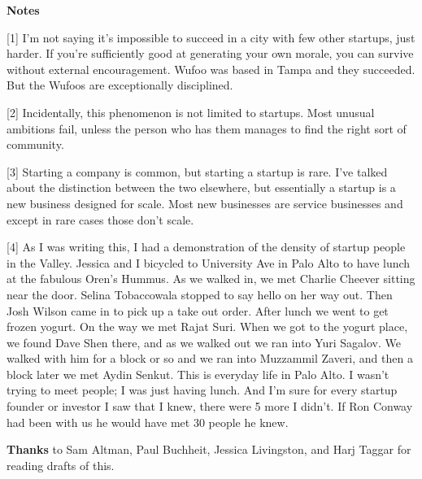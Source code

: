 \textbf{Notes}

[1] I'm not saying it's impossible to succeed in a city with
                    few other startups, just harder. If you're sufficiently good
                    at generating your own morale, you can survive without
                    external encouragement. Wufoo was based in Tampa and they
                    succeeded. But the Wufoos are exceptionally disciplined.

[2] Incidentally, this phenomenon is not limited to startups.
                    Most unusual ambitions fail, unless the person who has them
                    manages to find the right sort of community.

[3] Starting a company is common, but starting a startup is
                    rare. I've talked about the distinction between the two
                    elsewhere, but essentially a startup is a new business
                    designed for scale. Most new businesses are service
                    businesses and except in rare cases those don't scale.

[4] As I was writing this, I had a demonstration of the
                    density of startup people in the Valley. Jessica and I
                    bicycled to University Ave in Palo Alto to have lunch at the
                    fabulous Oren's Hummus. As we walked in, we met Charlie
                    Cheever sitting near the door. Selina Tobaccowala stopped to
                    say hello on her way out. Then Josh Wilson came in to pick
                    up a take out order. After lunch we went to get frozen
                    yogurt. On the way we met Rajat Suri. When we got to the
                    yogurt place, we found Dave Shen there, and as we walked out
                    we ran into Yuri Sagalov. We walked with him for a block or
                    so and we ran into Muzzammil Zaveri, and then a block later
                    we met Aydin Senkut. This is everyday life in Palo Alto. I
                    wasn't trying to meet people; I was just having lunch. And
                    I'm sure for every startup founder or investor I saw that I
                    knew, there were 5 more I didn't. If Ron Conway had been
                    with us he would have met 30 people he knew.



\textbf{Thanks}
                    to Sam Altman, Paul Buchheit, Jessica Livingston, and Harj
                    Taggar for reading drafts of this.



              
            
          
            
              
                


                  
              
            
          
